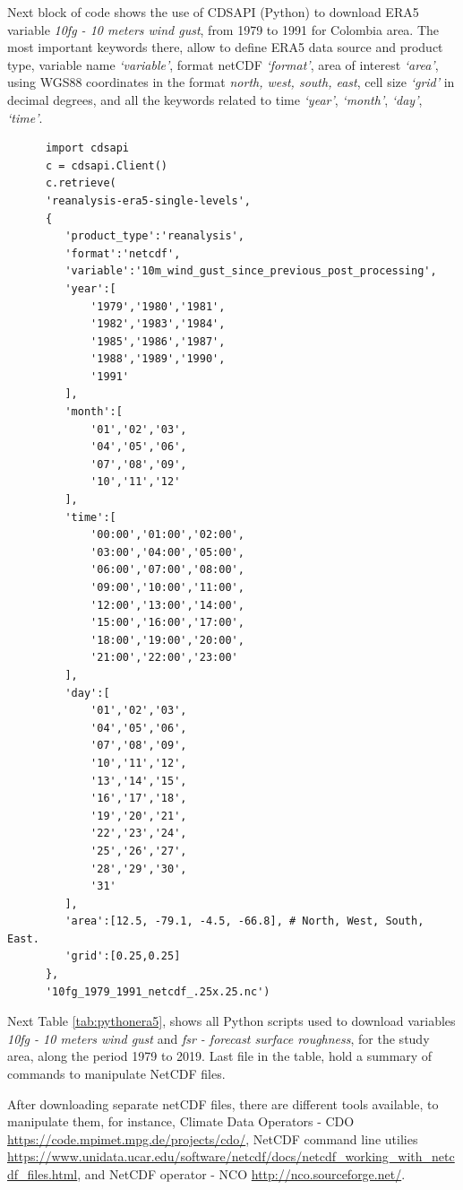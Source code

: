 \documentclass[12pt,oneside]{reedthesis}
\begin{document}
Next block of code shows the use of CDSAPI (Python) to download ERA5 variable \emph{10fg - 10 meters wind gust}, from 1979 to 1991 for Colombia area. The most important keywords there, allow to define ERA5 data source and product type, variable name \emph{`variable'}, format netCDF \emph{`format'}, area of interest \emph{`area'}, using WGS88 coordinates in the format \emph{north, west, south, east}, cell size \emph{`grid'} in decimal degrees, and all the keywords related to time \emph{`year'}, \emph{`month'}, \emph{`day'}, \emph{`time'}.
\begin{verbatim}
      import cdsapi
      c = cdsapi.Client()
      c.retrieve(
      'reanalysis-era5-single-levels',
      {
         'product_type':'reanalysis',
         'format':'netcdf',
         'variable':'10m_wind_gust_since_previous_post_processing',
         'year':[
             '1979','1980','1981',
             '1982','1983','1984',
             '1985','1986','1987',
             '1988','1989','1990',
             '1991'
         ],
         'month':[
             '01','02','03',
             '04','05','06',
             '07','08','09',
             '10','11','12'
         ],
         'time':[
             '00:00','01:00','02:00',
             '03:00','04:00','05:00',
             '06:00','07:00','08:00',
             '09:00','10:00','11:00',
             '12:00','13:00','14:00',
             '15:00','16:00','17:00',
             '18:00','19:00','20:00',
             '21:00','22:00','23:00'
         ],
         'day':[
             '01','02','03',
             '04','05','06',
             '07','08','09',
             '10','11','12',
             '13','14','15',
             '16','17','18',
             '19','20','21',
             '22','23','24',
             '25','26','27',
             '28','29','30',
             '31'
         ],
         'area':[12.5, -79.1, -4.5, -66.8], # North, West, South, East.
         'grid':[0.25,0.25]
      },
      '10fg_1979_1991_netcdf_.25x.25.nc')
\end{verbatim}
Next Table \ref{tab:pythonera5}, shows all Python scripts used to download variables \emph{10fg - 10 meters wind gust} and \emph{fsr - forecast surface roughness}, for the study area, along the period 1979 to 2019. Last file in the table, hold a summary of commands to manipulate NetCDF files.

After downloading separate netCDF files, there are different tools available, to manipulate them, for instance, Climate Data Operators - CDO \url{https://code.mpimet.mpg.de/projects/cdo/}, NetCDF command line utilies \url{https://www.unidata.ucar.edu/software/netcdf/docs/netcdf_working_with_netcdf_files.html}, and NetCDF operator - NCO \url{http://nco.sourceforge.net/}.
\end{document}
